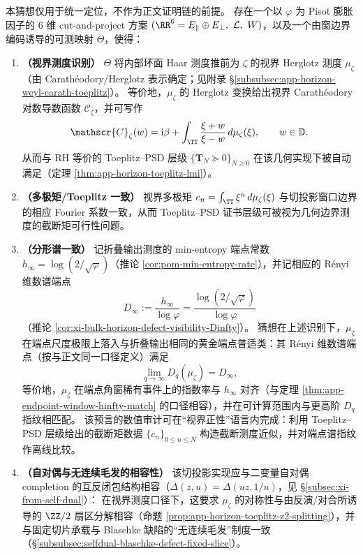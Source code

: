\begin{conjecture}\label{conj:discussion-horizon-measure-cutproject}
本猜想仅用于统一定位，不作为正文证明链的前提。
存在一个以 \(\varphi\) 为 Pisot 膨胀因子的 \(6\) 维 cut-and-project 方案 \((\RR^6=E_{\parallel}\oplus E_{\perp},\ \mathcal{L},\ W)\)，以及一个由窗边界编码诱导的可测映射 \(\Theta\)，使得：
\begin{enumerate}
  \item \textbf{（视界测度识别）}
  \(\Theta\) 将内部环面 Haar 测度推前为 \(\zeta\) 的视界 Herglotz 测度 \(\mu_\zeta\)（由 Carath\'eodory/Herglotz 表示确定；见附录 \S\ref{subsubsec:app-horizon-weyl-carath-toeplitz}）。
  等价地，\(\mu_\zeta\) 的 Herglotz 变换给出视界 Carath\'eodory 对数导数函数 \(\mathscr{C}_\zeta\)，并可写作
  \[
    \mathscr{C}_\zeta(w)=\mathrm{i}\beta+\int_{\TT}\frac{\xi+w}{\xi-w}\,d\mu_\zeta(\xi),
    \qquad w\in\mathbb{D}.
  \]
  从而与 RH 等价的 Toeplitz--PSD 层级
  \(\{\mathbf{T}_N\succeq 0\}_{N\ge 0}\) 在该几何实现下被自动满足（定理 \ref{thm:app-horizon-toeplitz-lmi}）。
  \item \textbf{（多极矩/Toeplitz 一致）}
  视界多极矩 \(c_n=\int_{\TT}\xi^n\,d\mu_\zeta(\xi)\) 与切投影窗口边界的相应 Fourier 系数一致，从而 Toeplitz--PSD 证书层级可被视为几何边界测度的截断矩可行性问题。
  \item \textbf{（分形谱一致）}
  记折叠输出测度的 min-entropy 端点常数 \(h_\infty=\log(2/\sqrt\varphi)\)（推论 \ref{cor:pom-min-entropy-rate}），并记相应的 Rényi 维数谱端点
  \[
    D_\infty:=\frac{h_\infty}{\log\varphi}=\frac{\log(2/\sqrt\varphi)}{\log\varphi}
  \]
  （推论 \ref{cor:xi-bulk-horizon-defect-visibility-Dinfty}）。
  猜想在上述识别下，\(\mu_\zeta\) 在端点尺度极限上落入与折叠输出相同的黄金端点普适类：其 Rényi 维数谱端点（按与正文同一口径定义）满足
  \[
    \lim_{q\to\infty}D_q(\mu_\zeta)=D_\infty,
  \]
  等价地，\(\mu_\zeta\) 在端点角窗稀有事件上的指数率与 \(h_\infty\) 对齐（与定理 \ref{thm:app-endpoint-window-hinfty-match} 的口径相容），并在可计算范围内与更高阶 \(D_q\) 指纹相匹配。
  该预言的数值审计可在“视界正性”语言内完成：利用 Toeplitz--PSD 层级给出的截断矩数据 \(\{c_n\}_{0\le n\le N}\) 构造截断测度近似，并对端点谱指纹作离线比较。
  \item \textbf{（自对偶与无连续毛发的相容性）}
  该切投影实现应与二变量自对偶 completion 的互反闭包结构相容（\(\Delta(z,u)=\Delta(uz,1/u)\)，见 \S\ref{subsec:xi-from-self-dual}）：
  在视界测度口径下，这要求 \(\mu_\zeta\) 的对称性与由反演/对合所诱导的 \(\ZZ/2\) 扇区分解相容（命题 \ref{prop:app-horizon-toeplitz-z2-splitting}），并与固定切片承载与 Blaschke 缺陷的“无连续毛发”制度一致（\S\ref{subsubsec:selfdual-blaschke-defect-fixed-slice}）。

\end{enumerate}
\end{conjecture}
